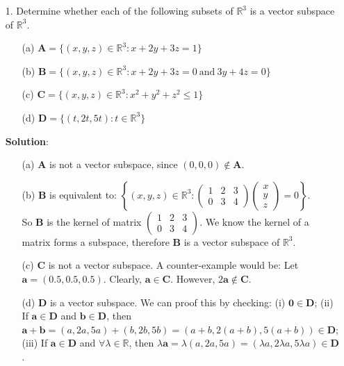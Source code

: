 \documentclass{article}
\begin{document}
\begin{enumerate}
    \item[1. ] Determine whether each of the following subsets of $\mathbb{R}^3$ is a vector subspace of $\mathbb{R}^3$.
        \begin{enumerate}
            \item[(a)] $ \mathbf{A} = \{(x,y,z) \in \mathbb{R}^3: x + 2y + 3z = 1\} $
            \item[(b)] $ \mathbf{B} = \{(x,y,z) \in \mathbb{R}^3: x + 2y + 3z = 0\ \textrm{and}\ 3y + 4z = 0 \} $
            \item[(c)] $ \mathbf{C} = \{(x,y,z) \in \mathbb{R}^3: x^2 + y^2 + z^2 \leq 1 \} $
            \item[(d)] $ \mathbf{D} = \{(t,2t,5t): t \in \mathbb{R}^3 \} $
        \end{enumerate}
        
      \textbf{Solution}: 
        \begin{enumerate}
            \item[(a)] $\mathbf{A}$ is not a vector subspace, since $(0,0,0) \not\in \mathbf{A}. $
            
            \item[(b)] $\mathbf{B}$ is equivalent to: $ \left\{(x,y,z) \in \mathbb{R}^3: \begin{pmatrix}1 &2 &3\\0 &3 &4\end{pmatrix} \begin{pmatrix}x\\y\\z\end{pmatrix} = 0 \right\} $.\\
            So $\mathbf{B}$ is the kernel of matrix $\begin{pmatrix}1 &2 &3\\0 &3 &4\end{pmatrix}$. We know the kernel of a matrix forms a subspace, therefore $\mathbf{B}$ is a vector subspace of $\mathbb{R}^3$.
            
            \item[(c)] $\mathbf{C}$ is not a vector subspace. A counter-example would be: 
            Let $\mathbf{a} = (0.5,0.5,0.5)$. Clearly, $\mathbf{a} \in \mathbf{C}$. However, $2\mathbf{a} \not\in \mathbf{C}$.
            
            \item[(d)] $\mathbf{D}$ is a vector subspace. We can proof this by checking: 
            (i) $\mathbf{0} \in \mathbf{D}$; 
            (ii) If $\mathbf{a} \in \mathbf{D}$ and $\mathbf{b} \in \mathbf{D}$, then $\mathbf{a} + \mathbf{b} = (a, 2a, 5a) + (b, 2b, 5b) = (a+b, 2(a+b), 5(a+b)) \in \mathbf{D}$; 
            (iii) If $\mathbf{a} \in \mathbf{D}$ and $\forall\lambda \in \mathbb{R}$, then $\lambda\mathbf{a} = \lambda(a, 2a, 5a) =  (\lambda a, 2\lambda a, 5\lambda a) \in \mathbf{D}$.
        \end{enumerate}
    

\end{enumerate}
\end{document}
